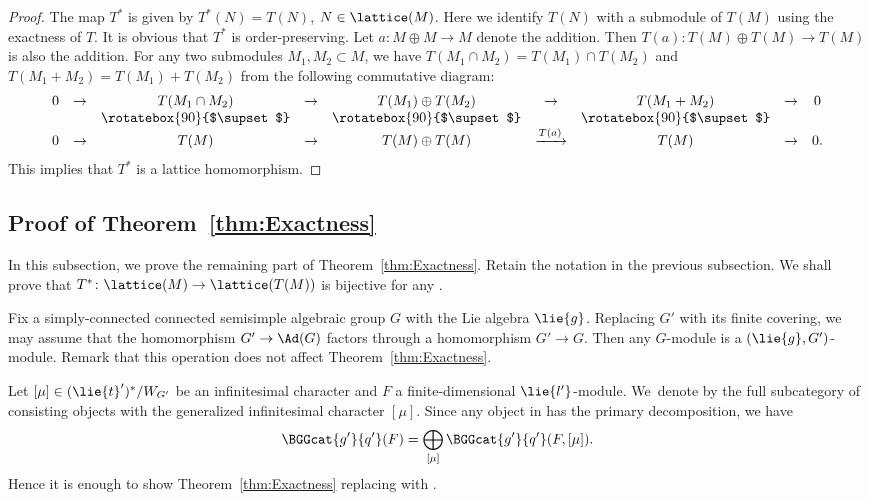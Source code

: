 \begin{proof}
	The map $T^*$ is given by $T^*(N) = T(N)$, $N \in \lattice(M)$.
	Here we identify $T(N)$ with a submodule of $T(M)$ using the exactness of $T$.
	It is obvious that $T^*$ is order-preserving.
	Let $a\colon M\oplus M\rightarrow M$ denote the addition.
	Then $T(a)\colon T(M)\oplus T(M)\rightarrow T(M)$ is also the addition.
	For any two submodules $M_1, M_2 \subset M$, we have $T(M_1 \cap M_2) = T(M_1) \cap T(M_2)$ and $T(M_1 + M_2) = T(M_1)+T(M_2)$ from the following commutative diagram:
	\begin{align*}
		\begin{array}{ccccccccc}
			0 &\rightarrow& T(M_1 \cap M_2) &\rightarrow &T(M_1) \oplus T(M_2)& \rightarrow& T(M_1 + M_2) &\rightarrow& 0 \\
			 & & \rotatebox{90}{$\supset$} & & \rotatebox{90}{$\supset$} & & \rotatebox{90}{$\supset$} & & \\
			0 &\rightarrow& T(M) &\rightarrow &T(M) \oplus T(M)& \xrightarrow{T(a)}& T(M) &\rightarrow& 0.
		\end{array}
	\end{align*}
	This implies that $T^*$ is a lattice homomorphism.
\end{proof}

\subsection{Proof of Theorem~\ref{thm:Exactness}}\label{subsect:ProofEmbedding}

In this subsection, we prove the remaining part of Theorem~\ref{thm:Exactness}.
Retain the notation in the previous subsection.
We shall prove that $T^*\colon \lattice(M) \rightarrow \lattice(T(M))$ is bijective for any .

Fix a simply-connected connected semisimple algebraic group $G$ with the Lie algebra $\lie{g}$.
Replacing $G'$ with its finite covering, we may assume that the homomorphism $G'\rightarrow \Ad(G)$
factors through a homomorphism $G'\rightarrow G$.
Then any $G$-module is a $(\lie{g}, G')$-module.
Remark that this operation does not affect Theorem~\ref{thm:Exactness}.

Let $[\mu] \in (\lie{t}')^*/W_{G'}$ be an infinitesimal character and $F$ a finite-dimensional $\lie{l'}$-module.
We~denote by  the full subcategory of  consisting objects
with the generalized infinitesimal character $[\mu]$.
Since any object in  has the primary decomposition, we have
\begin{align*}
	\BGGcat{g'}{q'}(F) = \bigoplus_{[\mu]} \BGGcat{g'}{q'}(F, [\mu]).
\end{align*}
Hence it is enough to show Theorem~\ref{thm:Exactness} replacing  with .

